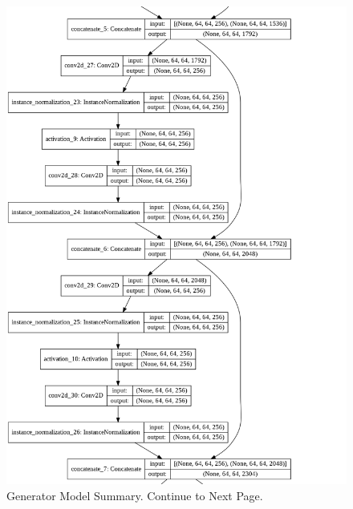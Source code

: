 \begin{figure}[H]
        \vspace*{2cm}
	    \begin{center} 
	    \includegraphics[scale=0.40]{images/Appendix/generator_5.png}
	    \caption{Generator Model Summary. Continue to Next Page.}
	    \end{center}
\end{figure}



